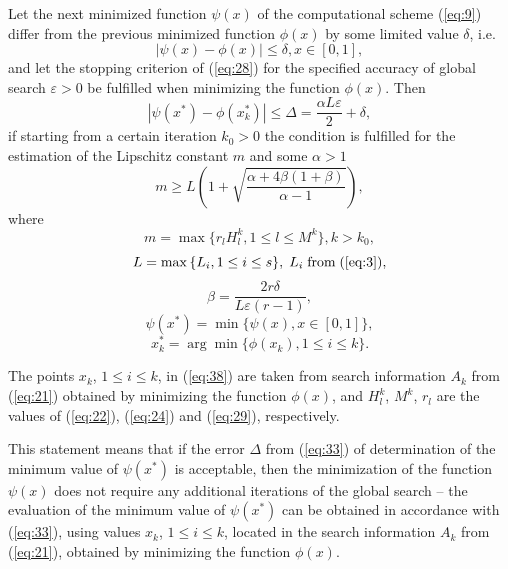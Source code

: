 \documentclass[smallextended]{svjour3}       %
\begin{document}
\begin{theorem}
Let the next minimized function $\psi(x)$ of the computational scheme (\ref{eq:9}) differ from the previous minimized function $\phi(x)$ by some limited value $\delta$, i.e.
\begin{equation}\label{eq:32}
|\psi(x)-\phi(x)| \leq \delta, x \in [0,1],
\end{equation}
and let the stopping criterion of (\ref{eq:28}) for the specified accuracy of global search $\varepsilon>0$ be fulfilled when minimizing the function $\phi(x)$. Then 
\begin{equation}\label{eq:33}
|\psi(x^*)-\phi(x_k^*)| \leq \Delta = \frac{\alpha L \varepsilon}{2} + \delta,
\end{equation}
if starting from a certain iteration $k_0>0$ the condition is fulfilled for the estimation of the Lipschitz constant $m$ and some $\alpha > 1$
\begin{equation}\label{eq:34}
m \geq L (1+ \sqrt{\frac{\alpha + 4 \beta (1 + \beta)}{\alpha - 1}}),
\end{equation}
where
\begin{equation}\label{eq:35}
m=\max{\{r_l H_l^k, 1 \leq l \leq M^k \} }, k>k_0,
\end{equation}
\begin{equation}\label{eq:36}
L=\max{\{L_i, 1 \leq i \leq s \}}, \; L_i\; \text{from}\; (\ref{eq:3}),
\end{equation}
\begin{equation}\label{eq:beta}
\beta =  \frac{2r\delta} {L\varepsilon(r-1)},
\end{equation}
\begin{equation}\label{eq:37}
\psi(x^*)=\min{\{\psi(x), x \in [0,1]\}},
\end{equation}
\begin{equation}\label{eq:38}
x_k^* = \arg \min{\{\phi(x_k), 1 \leq i \leq k\}}.
\end{equation}
\end{theorem}
The points $x_k$, $1 \leq i \leq k$, in (\ref{eq:38}) are taken from search information $A_k$ from (\ref{eq:21}) obtained by minimizing the function $\phi(x)$, and $H_l^k$, $M^k$, $r_l$ are the values of (\ref{eq:22}), (\ref{eq:24}) and (\ref{eq:29}), respectively.

This statement means that if the error $\Delta$ from (\ref{eq:33}) of determination of the minimum value of $\psi(x^*)$ is acceptable, then the minimization of the function $\psi(x)$ does not require any additional iterations of the global search -- the evaluation of the minimum value of $\psi(x^*)$ can be obtained in accordance with (\ref{eq:33}), using values $x_k$, ${1 \leq i \leq k}$, located in the search information $A_k$ from (\ref{eq:21}), obtained by minimizing the function $\phi(x)$.
\end{document}
